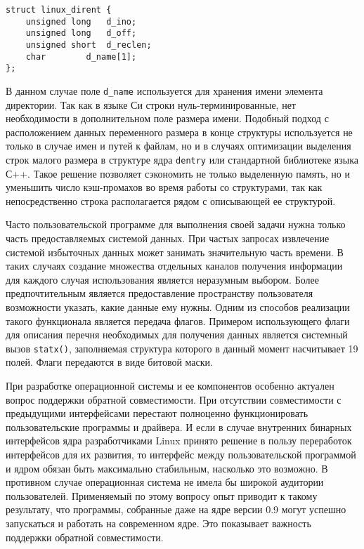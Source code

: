 \medskip
\begin{lstlisting}[style=cstyle]
struct linux_dirent {
	unsigned long	d_ino;
	unsigned long	d_off;
	unsigned short	d_reclen;
	char		d_name[1];
};
\end{lstlisting}
\medskip

В данном случае поле \texttt{d\_name} используется для хранения имени элемента
директории. Так как в языке Си строки нуль-терминированные, нет необходимости в
дополнительном поле размера имени. Подобный подход с расположением данных
переменного размера в конце структуры используется не только в случае имен и
путей к файлам, но и в случаях оптимизации выделения строк малого размера в
структуре ядра \texttt{dentry} или стандартной библиотеке языка С++. Такое
решение позволяет сэкономить не только выделенную память, но и уменьшить число
кэш-промахов во время работы со структурами, так как непосредственно строка
располагается рядом с описывающей ее структурой.

Часто пользовательской программе для выполнения своей задачи нужна только часть
предоставляемых системой данных. При частых запросах извлечение системой
избыточных данных может занимать значительную часть времени. В таких случаях
создание множества отдельных каналов получения информации для каждого случая
использования является неразумным выбором. Более предпочтительным является
предоставление пространству пользователя возможности указать, какие данные ему
нужны. Одним из способов реализации такого функционала является передача флагов.
Примером использующего флаги для описания перечня необходимых для получения
данных является системный вызов \texttt{statx()}, заполняемая структура которого
в данный момент насчитывает 19 полей. Флаги передаются в виде битовой маски.

При разработке операционной системы и ее компонентов особенно актуален вопрос
поддержки обратной совместимости. При отсутствии совместимости с предыдущими
интерфейсами перестают полноценно функционировать пользовательские программы и
драйвера. И если в случае внутренних бинарных интерфейсов ядра разработчиками
Linux принято решение в пользу переработок интерфейсов для их развития, то
интерфейс между пользовательской программой и ядром обязан быть максимально
стабильным, насколько это возможно. В противном случае операционная система не
имела бы широкой аудитории пользователей. Применяемый по этому вопросу опыт
приводит к такому результату, что программы, собранные даже на ядре версии 0.9
могут успешно  запускаться и работать на современном ядре. Это показывает
важность поддержки обратной совместимости.

